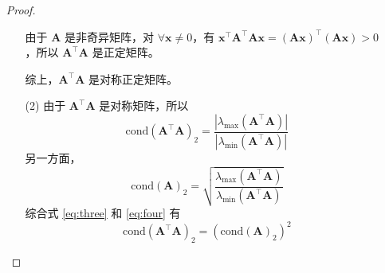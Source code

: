 \documentclass{sjtuarticle}
\begin{document}
\begin{itemize}
\begin{proof}
\begin{itemize}
            由于 $\bm{A}$ 是非奇异矩阵，对 $\forall \bm{x}\neq 0$，有 $\bm{x}^\top\bm{A}^\top\bm{A}\bm{x}=(\bm{Ax})^\top(\bm{Ax})>0$，所以 $\bm{A}^\top\bm{A}$ 是正定矩阵。

            综上，$\bm{A}^\top\bm{A}$ 是对称正定矩阵。
            \item[(2)] 由于 $\bm{A}^\top\bm{A}$ 是对称矩阵，所以
            \begin{equation}\label{eq:three}
                \text{cond}(\bm{A}^\top\bm{A})_2=\frac{|\lambda_{\max}(\bm{A}^\top\bm{A})|}{|\lambda_{\min}(\bm{A}^\top\bm{A})|}
            \end{equation}
            另一方面，
            \begin{equation}\label{eq:four}
                \text{cond}(\bm{A})_2=\sqrt{\frac{\lambda_{\max}(\bm{A}^\top\bm{A})}{\lambda_{\min}(\bm{A}^\top\bm{A})}}
            \end{equation}
            综合式 \eqref{eq:three} 和 \eqref{eq:four} 有
            \begin{equation*}
                \text{cond}(\bm{A}^\top\bm{A})_2=(\text{cond}(\bm{A})_2)^2
            \end{equation*}
        \end{itemize}
    \end{proof}
\end{itemize}
\end{document}
